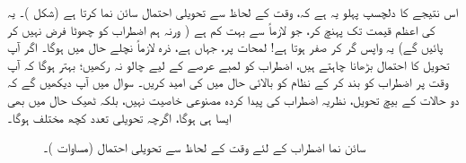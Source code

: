اس نتیجے کا دلچسپ پہلو یہ ہے کہ، وقت کے لحاظ سے تحویلی احتمال سائن نما  کرتا ہے (شکل )۔
 یہ  کی اعظم قیمت تک پہنچ کر، جو لازماً  سے بہت کم ہے ( ورنہ ہم اضطراب کو چھوٹا فرض نہیں کر پائیں گے) یہ واپس گر کر صفر ہوتا ہے! لمحات  پر، جہاں  ہے، ذرہ لازماً نچلے حال میں ہوگا۔ اگر آپ تحویل کا احتمال بڑھانا چاہتے ہیں، اضطراب کو لمبے عرصے کے لیے چالو نہ رکھیں؛ بہتر ہوگا کہ آپ وقت  پر اضطراب کو بند کر کے نظام کو بالائی حال میں  کی امید کریں۔ سوال  میں آپ دیکھیں گے کہ دو حالات کے بیچ تحویل، نظریہ اضطراب کی پیدا کردہ مصنوعی خاصیت نہیں، بلکہ ٹھیک حال میں بھی ایسا ہی ہوگا، اگرچہ تحویلی تعدد کچھ مختلف ہوگا۔

\begin{figure}
\centering
{}
\caption{سائن نما اضطراب کے لئے وقت کے لحاظ سے تحویلی احتمال (مساوات )۔}
\label{شکل_تابع_وقت_احتمال_سائن_نما_احتمال}
\end{figure}


